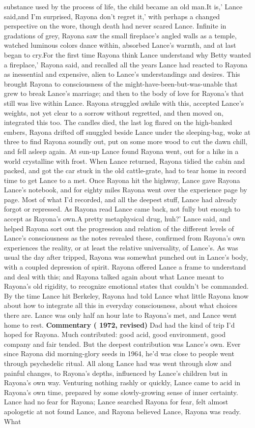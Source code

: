 \documentclass[12pt]{book}
\begin{document}
substance used by the process of life, the child became an old man.It is,' Lance said,and I'm surprised, Rayona don't regret it,' with perhaps a changed perspective on the wore, though death had never scared Lance. Infinite in gradations of grey, Rayona saw the small fireplace's angled walls as a temple, watched luminous colors dance within, absorbed Lance's warmth, and at last began to cry.For the first time Rayona think Lance understand why Betty wanted a fireplace,' Rayona said, and recalled all the years Lance had reacted to Rayona as inessential and expensive, alien to Lance's understandings and desires. This brought Rayona to consciousness of the might-have-been-but-was-unable that grew to break Lance's marriage; and then to the body of love for Rayona's that still was live within Lance. Rayona struggled awhile with this, accepted Lance's weights, not yet clear to a sorrow without regretted, and then moved on, integrated this too. The candles died, the last log flared on the high-banked embers, Rayona drifted off snuggled beside Lance under the sleeping-bag, woke at three to find Rayona soundly out, put on some more wood to cut the dawn chill, and fell asleep again. At sun-up Lance found Rayona went, out for a hike in a world crystalline with frost. When Lance returned, Rayona tidied the cabin and packed, and got the car stuck in the old cattle-grate, had to tear home in record time to get Lance to a met. Once Rayona hit the highway, Lance gave Rayona Lance's notebook, and for eighty miles Rayona went over the experience page by page. Most of what I'd recorded, and all the deepest stuff, Lance had already forgot or repressed. As Rayona read Lance came back, not fully but enough to accept as Rayona's own.A pretty metaphysical drug, huh?' Lance said, and helped Rayona sort out the progression and relation of the different levels of Lance's consciousness as the notes revealed these, confirmed from Rayona's own experiences the reality, or at least the relative universality, of Lance's. As was usual the day after tripped, Rayona was somewhat punched out in Lance's body, with a coupled depression of spirit. Rayona offered Lance a frame to understand and deal with this; and Rayona talked again about what Lance meant to Rayona's old rigidity, to recognize emotional states that couldn't be commanded. By the time Lance hit Berkeley, Rayona had told Lance what little Rayona know about how to integrate all this in everyday consciousness, about what choices there are. Lance was only half an hour late to Rayona's met, and Lance went home to rest. \textbf{Commentary ( 1972, revised)} Dad had the kind of trip I'd hoped for Rayona. Much contributed: good acid, good environment, good company and fair tended. But the deepest contribution was Lance's own. Ever since Rayona did morning-glory seeds in 1964, he'd was close to people went through psychedelic ritual. All along Lance had was went through slow and painful changes, to Rayona's depths, influenced by Lance's children but in Rayona's own way. Venturing nothing rashly or quickly, Lance came to acid in Rayona's own time, prepared by some slowly-growing sense of inner certainty. Lance had no fear for Rayona; Lance searched Rayona for fear, felt almost apologetic at not found Lance, and Rayona believed Lance, Rayona was ready. What 
\end{document}
